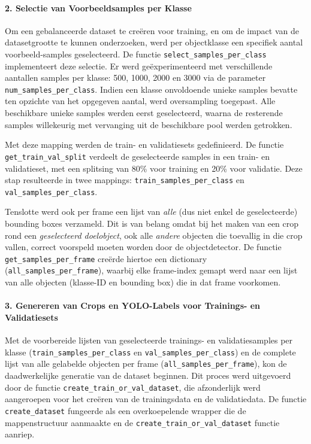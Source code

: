 \paragraph{2. Selectie van Voorbeeldsamples per Klasse}
Om een gebalanceerde dataset te creëren voor training, en om de impact van de datasetgrootte te kunnen onderzoeken, 
werd per objectklasse een specifiek aantal voorbeeld-samples geselecteerd. 
De functie \texttt{select\_samples\_per\_class} implementeert deze selectie. 
Er werd geëxperimenteerd met verschillende aantallen samples per klasse: 500, 1000, 2000 en 3000 via de parameter \texttt{num\_samples\_per\_class}.
Indien een klasse onvoldoende unieke samples bevatte ten opzichte van het opgegeven aantal, werd oversampling toegepast.
Alle beschikbare unieke samples werden eerst geselecteerd, waarna de resterende samples willekeurig met vervanging uit de beschikbare pool werden getrokken.

Met deze mapping werden de train- en validatiesets gedefinieerd.
De functie \texttt{get\_train\_val\_split} verdeelt de geselecteerde samples in een train- en validatieset,
met een splitsing van 80\% voor training en 20\% voor validatie.
Deze stap resulteerde in twee mappings: \texttt{train\_samples\_per\_class} en \texttt{val\_samples\_per\_class}.

Tenslotte werd ook per frame een lijst van \textit{alle} (dus niet enkel de geselecteerde) bounding boxes verzameld.
Dit is van belang omdat bij het maken van een crop rond een \textit{geselecteerd doelobject},
ook alle \textit{andere} objecten die toevallig in die crop vallen, correct voorspeld moeten worden door de objectdetector.
De functie \texttt{get\_samples\_per\_frame} creërde hiertoe een dictionary (\texttt{all\_samples\_per\_frame}), 
waarbij elke frame-index gemapt werd naar een lijst van alle objecten (klasse-ID en bounding box) die in dat frame voorkomen.

\paragraph{3. Genereren van Crops en YOLO-Labels voor Trainings- en Validatiesets}
Met de voorbereide lijsten van geselecteerde trainings- en validatiesamples per 
klasse (\texttt{train\_samples\_per\_class} en \texttt{val\_samples\_per\_class}) 
en de complete lijst van alle gelabelde objecten per frame (\texttt{all\_samples\_per\_frame}), 
kon de daadwerkelijke generatie van de dataset beginnen. 
Dit proces werd uitgevoerd door de functie \texttt{create\_train\_or\_val\_dataset}, 
die afzonderlijk werd aangeroepen voor het creëren van de trainingsdata en de validatiedata. 
De functie \texttt{create\_dataset} fungeerde als een overkoepelende wrapper die de mappenstructuur 
aanmaakte en de \texttt{create\_train\_or\_val\_dataset} functie aanriep.

